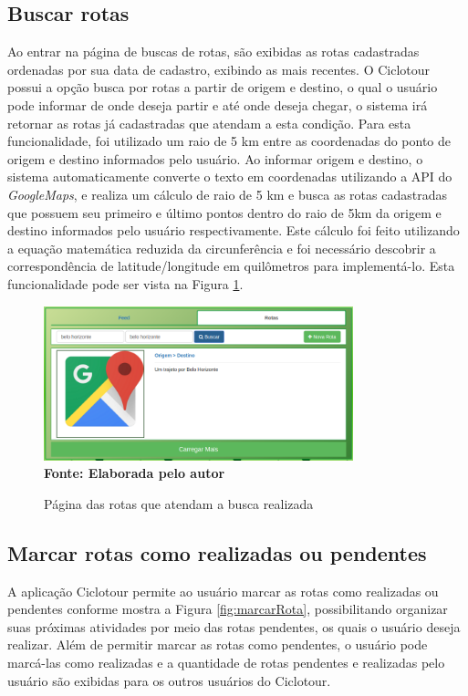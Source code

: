 \subsection{Buscar rotas}
Ao entrar na página de buscas de rotas, são exibidas as rotas cadastradas ordenadas por sua data de cadastro, exibindo as mais recentes.
O Ciclotour possui a opção busca por rotas a partir de origem e destino, o qual o usuário pode informar de onde deseja partir e até onde deseja 
chegar, o sistema irá retornar as rotas já cadastradas que atendam a esta condição. Para esta funcionalidade, foi utilizado um raio de 5 km entre 
as coordenadas do ponto de origem e destino informados pelo usuário. Ao informar origem e destino, o sistema automaticamente converte o texto em 
coordenadas utilizando a API do \textit{GoogleMaps}, e realiza um cálculo de raio de 5 km e busca as rotas cadastradas
que possuem seu primeiro e último pontos
dentro do raio de 5km da origem e destino informados pelo usuário respectivamente. Este cálculo foi feito utilizando a equação matemática reduzida da 
circunferência e foi necessário descobrir a correspondência de latitude/longitude em quilômetros para implementá-lo. Esta funcionalidade pode ser 
vista na Figura \ref{fig:buscarRotas}.

\begin{figure}[!ht]
	\centering	
	\caption[\hspace{0.1cm} Buscar Rotas.]
	{Página das rotas que atendam a busca realizada}
	  \vspace{-0.4cm}
	\includegraphics[width=0.8\textwidth]{figuras/buscarRotas.png}
	 \vspace{0cm}
	\\\textbf{\footnotesize Fonte: Elaborada pelo autor}
	\label{fig:buscarRotas}
\end{figure}

\subsection{Marcar rotas como realizadas ou pendentes}
A aplicação Ciclotour permite ao usuário marcar as rotas como realizadas ou pendentes conforme mostra 
a Figura \ref{fig:marcarRota}, possibilitando organizar
suas próximas atividades por meio das rotas pendentes, os quais o usuário deseja realizar. Além de permitir marcar as
rotas como pendentes, o usuário pode
marcá-las como realizadas e a quantidade de rotas pendentes e realizadas pelo usuário são exibidas para os outros usuários do Ciclotour.

